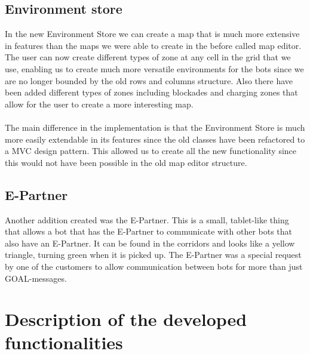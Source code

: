 \documentclass[]{article}
\begin{document}
\subsection{Environment store}
In the new Environment Store we can create a map that is much more extensive in features than the maps we were able to create in the before called map editor. The user can now create different types of zone at any cell in the grid that we use, enabling us to create much more versatile environments for the bots since we are no longer bounded by the old rows and columns structure. Also there have been added different types of zones including blockades and charging zones that allow for the user to create a more interesting map.\\
\\
The main difference in the implementation is that the Environment Store is much more easily extendable in its features since the old classes have been refactored to a MVC design pattern. This allowed us to create all the new functionality since this would not have been possible in the old map editor structure.
\subsection{E-Partner}
Another addition created was the E-Partner. This is a small, tablet-like thing that allows a bot that has the E-Partner to communicate with other bots that also have an E-Partner. It can be found in the corridors and looks like a yellow triangle, turning green when it is picked up. The E-Partner was a special request by one of the customers to allow communication between bots for more than just GOAL-messages. 
\section{Description of the developed functionalities}
\end{document}
